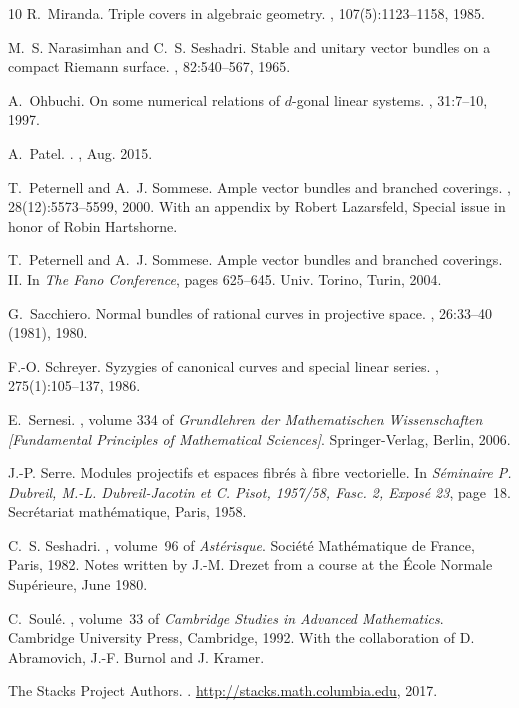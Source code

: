 \documentclass[11 pt]{amsart}
\numberwithin{equation}{section}
\begin{document}
\begin{thebibliography}{10}
R.~Miranda.
\newblock Triple covers in algebraic geometry.
, 107(5):1123--1158, 1985.

M.~S. Narasimhan and C.~S. Seshadri.
\newblock Stable and unitary vector bundles on a compact {R}iemann surface.
, 82:540--567, 1965.

A.~Ohbuchi.
\newblock On some numerical relations of {$d$}-gonal linear systems.
, 31:7--10, 1997.

A.~{Patel}.
.
, Aug. 2015.

T.~Peternell and A.~J. Sommese.
\newblock Ample vector bundles and branched coverings.
, 28(12):5573--5599, 2000.
\newblock With an appendix by Robert Lazarsfeld, Special issue in honor of
  Robin Hartshorne.

T.~Peternell and A.~J. Sommese.
\newblock Ample vector bundles and branched coverings. {II}.
\newblock In {\em The {F}ano {C}onference}, pages 625--645. Univ. Torino,
  Turin, 2004.

G.~Sacchiero.
\newblock Normal bundles of rational curves in projective space.
, 26:33--40 (1981), 1980.

F.-O. Schreyer.
\newblock Syzygies of canonical curves and special linear series.
, 275(1):105--137, 1986.

E.~Sernesi.
, volume 334 of {\em
  Grundlehren der Mathematischen Wissenschaften [Fundamental Principles of
  Mathematical Sciences]}.
\newblock Springer-Verlag, Berlin, 2006.

J.-P. Serre.
\newblock Modules projectifs et espaces fibr\'{e}s \`a fibre vectorielle.
\newblock In {\em S\'{e}minaire {P}. {D}ubreil, {M}.-{L}. {D}ubreil-{J}acotin
  et {C}. {P}isot, 1957/58, {F}asc. 2, {E}xpos\'{e} 23}, page~18.
  Secr\'{e}tariat math\'{e}matique, Paris, 1958.

C.~S. Seshadri.
, volume~96 of
  {\em Ast\'erisque}.
\newblock Soci\'et\'e Math\'ematique de France, Paris, 1982.
\newblock Notes written by J.-M. Drezet from a course at the \'Ecole Normale
  Sup\'erieure, June 1980.

C.~Soul\'{e}.
, volume~33 of {\em Cambridge
  Studies in Advanced Mathematics}.
\newblock Cambridge University Press, Cambridge, 1992.
\newblock With the collaboration of D. Abramovich, J.-F. Burnol and J. Kramer.

{The Stacks Project Authors}.
.
\newblock \url{http://stacks.math.columbia.edu}, 2017.

\end{thebibliography}
 

\end{document}
